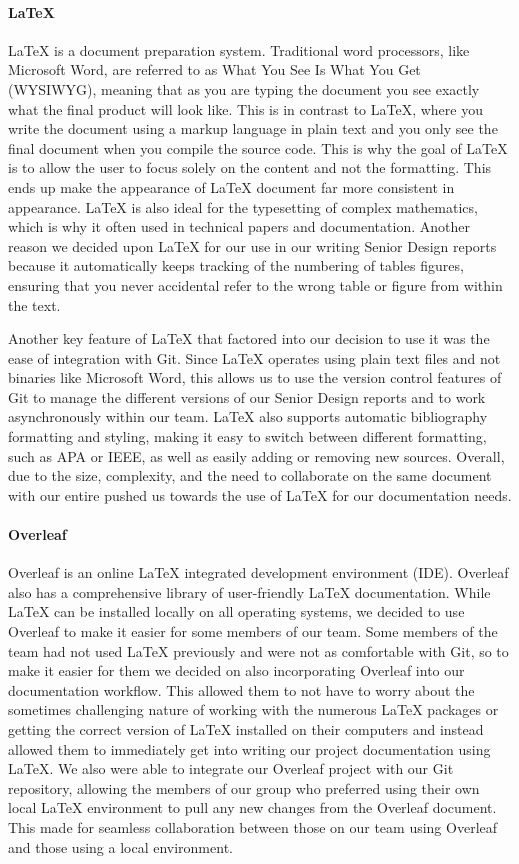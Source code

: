 \paragraph{LaTeX}
LaTeX is a document preparation system. Traditional word processors, like Microsoft Word, are referred to as What You See Is What You Get (WYSIWYG), meaning that as you are typing the document you see exactly what the final product will look like. This is in contrast to LaTeX, where you write the document using a markup language in plain text and you only see the final document when you compile the source code. This is why the goal of LaTeX is to allow the user to focus solely on the content and not the formatting. This ends up make the appearance of LaTeX document far more consistent in appearance. LaTeX is also ideal for the typesetting of complex mathematics, which is why it often used in technical papers and documentation. Another reason we decided upon LaTeX for our use in our writing Senior Design reports because it automatically keeps tracking of the numbering of tables figures, ensuring that you never accidental refer to the wrong table or figure from within the text. 

Another key feature of LaTeX that factored into our decision to use it was the ease of integration with Git. Since LaTeX operates using plain text files and not binaries like Microsoft Word, this allows us to use the version control features of Git to manage the different versions of our Senior Design reports and to work asynchronously within our team. LaTeX also supports automatic bibliography formatting and styling, making it easy to switch between different formatting, such as APA or IEEE, as well as easily adding or removing new sources. Overall, due to the size, complexity, and the need to collaborate on the same document with our entire pushed us towards the use of LaTeX for our documentation needs.

\paragraph{Overleaf}
Overleaf is an online LaTeX integrated development environment (IDE). Overleaf also has a comprehensive library of user-friendly LaTeX documentation. While LaTeX can be installed locally on all operating systems, we decided to use Overleaf to make it easier for some members of our team. Some members of the team had not used LaTeX previously and were not as comfortable with Git, so to make it easier for them we decided on also incorporating Overleaf into our documentation workflow. This allowed them to not have to worry about the sometimes challenging nature of working with the numerous LaTeX packages or getting the correct version of LaTeX installed on their computers and instead allowed them to immediately get into writing our project documentation using LaTeX. We also were able to integrate our Overleaf project with our Git repository, allowing the members of our group who preferred using their own local LaTeX environment to pull any new changes from the Overleaf document. This made for seamless collaboration between those on our team using Overleaf and those using a local environment.

